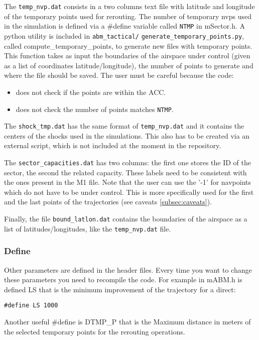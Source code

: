 \documentclass[12pt]{article}
\begin{document}
The \verb|temp_nvp.dat| consists in a two columns text file with latitude and longitude of the temporary points used for rerouting. The number of temporary nvps used in the simulation is defined via a \#define variable called \verb|NTMP| in mSector.h. A python utility is included in \verb|abm_tactical/| \verb|generate_temporary_points.py|, called compute\_temporary\_points, to generate new files with temporary points. This function takes as input the boundaries of the airspace under control (given as a list of coordinates latitude/longitude), the number of points to generate and  where the file should be saved. The user must be careful because the code:
\begin{itemize}
\item does not check if the points are within the ACC. 
\item does not check the number of points matches \verb|NTMP|.
\end{itemize}


The \verb|shock_tmp.dat| has the same format of \verb|temp_nvp.dat| and it contains the centers of the shocks used in the simulations. This also has to be created via an external script, which is not included at the moment in the repository.

The \verb|sector_capacities.dat| has two columns: the first one stores the ID of the sector, the second the related capacity. These labels need to be consistent with the ones present in the M1 file. Note that the user can use the '-1' for navpoints which do not have to be under control. This is more specifically used for the first and the last points of the trajectories (see caveats \ref{subsec:caveats}).

Finally, the file \verb|bound_latlon.dat| contains the boundaries of the airspace as a list of latitudes/longitudes, like the \verb|temp_nvp.dat| file.

\subsubsection{Define}

Other parameters are defined in the header files. Every time you want to change these parameters you need to recompile the code. For example in mABM.h is defined LS that is the minimum improvement of the trajectory for a direct:
\begin{verbatim}
#define LS 1000
\end{verbatim}

Another useful \#define is DTMP\_P that is the Maximum distance in meters of the selected temporary points for the rerouting operations.
\end{document}
